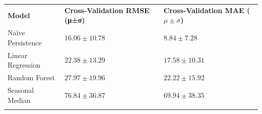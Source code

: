 \documentclass[
]{article}
\newcounter{none} %
\begin{document}
{\def\LTcaptype{none} %
\begin{longtable}[]{@{}
  >{\raggedright\arraybackslash}p{}
  >{\raggedright\arraybackslash}p{}
  >{\raggedright\arraybackslash}p{}@{}}
\toprule\noalign{}
\begin{minipage}[b]{\linewidth}\raggedright
\textbf{Model}
\end{minipage} & \begin{minipage}[b]{\linewidth}\raggedright
\textbf{Cross-Validation RMSE (μ±σ)}
\end{minipage} & \begin{minipage}[b]{\linewidth}\raggedright
\textbf{Cross-Validation MAE (}\(\mu \pm \sigma\)\textbf{)}
\end{minipage} \\
\begin{minipage}[b]{\linewidth}\raggedright
Naïve Persistence
\end{minipage} & \begin{minipage}[b]{\linewidth}\raggedright
\(16.06 \pm 10.78\)
\end{minipage} & \begin{minipage}[b]{\linewidth}\raggedright
\(8.84 \pm 7.28\)
\end{minipage} \\
\begin{minipage}[b]{\linewidth}\raggedright
Linear Regression
\end{minipage} & \begin{minipage}[b]{\linewidth}\raggedright
\(22.38 \pm 13.29\)
\end{minipage} & \begin{minipage}[b]{\linewidth}\raggedright
\(17.58 \pm 10.31\)
\end{minipage} \\
\begin{minipage}[b]{\linewidth}\raggedright
Random Forest
\end{minipage} & \begin{minipage}[b]{\linewidth}\raggedright
\(27.97 \pm 19.96\)
\end{minipage} & \begin{minipage}[b]{\linewidth}\raggedright
\(22.22 \pm 15.92\)
\end{minipage} \\
\begin{minipage}[b]{\linewidth}\raggedright
Seasonal Median
\end{minipage} & \begin{minipage}[b]{\linewidth}\raggedright
\(76.84 \pm 36.87\)
\end{minipage} & \begin{minipage}[b]{\linewidth}\raggedright
\(69.94 \pm 38.35\)
\end{minipage} \\
\midrule\noalign{}
\endhead
\bottomrule\noalign{}
\endlastfoot
\end{longtable}
}
\end{document}
